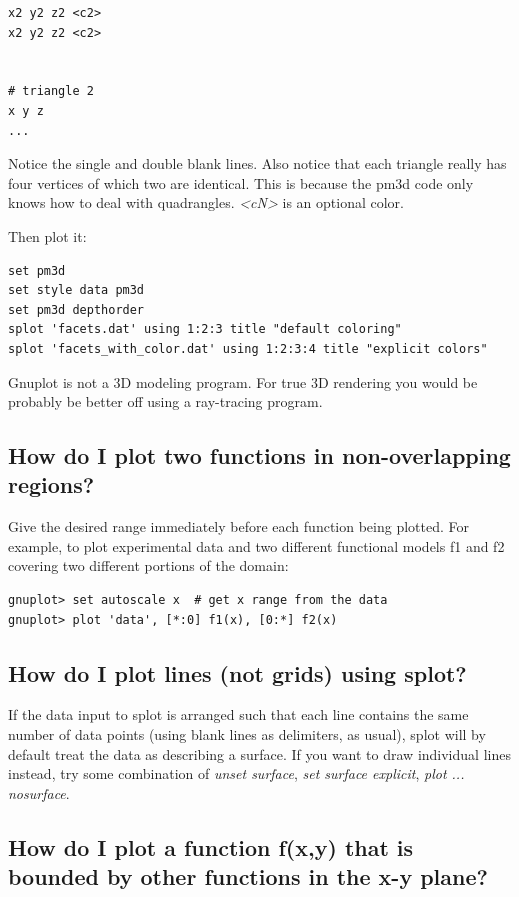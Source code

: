 \documentclass[letter,11pt]{article}
\begin{document}
{\begin{verbatim}
x2 y2 z2 <c2>
x2 y2 z2 <c2>


# triangle 2
x y z
...
\end{verbatim}
\normalsize

Notice the single and double blank lines. Also notice that each triangle
really has four vertices of which two are identical.  This is because the
pm3d code only knows how to deal with quadrangles.
\textit{<cN>} is an optional color.

Then plot it:
\small
\begin{verbatim}
set pm3d
set style data pm3d
set pm3d depthorder
splot 'facets.dat' using 1:2:3 title "default coloring"
splot 'facets_with_color.dat' using 1:2:3:4 title "explicit colors"
\end{verbatim}
\normalsize

Gnuplot is not a 3D modeling program.
For true 3D rendering you would be probably be better off using a ray-tracing program.

\subsection{How do I plot two functions in non-overlapping regions?}

Give the desired range immediately before each function being plotted.
For example, to plot experimental data and two different functional
models f1 and f2 covering two different portions of the domain:
\small
\begin{verbatim}
gnuplot> set autoscale x  # get x range from the data
gnuplot> plot 'data', [*:0] f1(x), [0:*] f2(x)
\end{verbatim}
\normalsize


\subsection{How do I plot lines (not grids) using splot?}

If the data input to splot is arranged such that each line contains
the same number of data points (using blank lines as delimiters, as usual),
splot will by default treat the data as describing a surface.
If you want to draw individual lines instead, try some combination of
\textit{unset surface}, \textit{set surface explicit}, \textit{plot ... nosurface}.


\subsection{How do I plot a function f(x,y) that is bounded by other
          functions in the x-y plane?}

}
\end{document}
